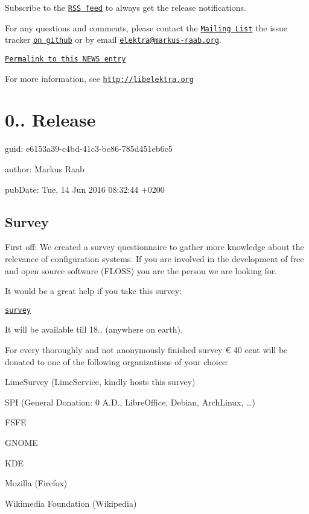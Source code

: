 Subscribe to the \href{http://doc.libelektra.org/news/feed.rss}{\tt R\+S\+S feed} to always get the release notifications.

For any questions and comments, please contact the \href{https://lists.sourceforge.net/lists/listinfo/registry-list}{\tt Mailing List} the issue tracker \href{http://git.libelektra.org/issues}{\tt on github} or by email \href{mailto:elektra@markus-raab.org}{\tt elektra@markus-\/raab.\+org}.

\href{http://doc.libelektra.org/news/190576e0-9fef-486e-b8da-c4e75be08329.html}{\tt Permalink to this N\+E\+W\+S entry}

For more information, see \href{http://libelektra.org}{\tt http\+://libelektra.\+org}

\section*{0.. Release}


\begin{DoxyItemize}
\item guid\+: e6153a39-\/c4bd-\/41c3-\/bc86-\/785d451eb6c5
\item author\+: Markus Raab
\item pub\+Date\+: Tue, 14 Jun 2016 08\+:32\+:44 +0200
\end{DoxyItemize}

\subsection*{Survey}

First off\+: We created a survey questionnaire to gather more knowledge about the relevance of configuration systems. If you are involved in the development of free and open source software (F\+L\+O\+S\+S) you are the person we are looking for.

It would be a great help if you take this survey\+:

\href{http://elektra.limequery.org/625192}{\tt survey}

It will be available till 18.. (anywhere on earth).

For every thoroughly and not anonymously finished survey € 40 cent will be donated to one of the following organizations of your choice\+:


\begin{DoxyItemize}
\item Lime\+Survey (Lime\+Service, kindly hosts this survey)
\item S\+P\+I (General Donation\+: 0 A.\+D., Libre\+Office, Debian, Arch\+Linux, …)
\item F\+S\+F\+E
\item G\+N\+O\+M\+E
\item K\+D\+E
\item Mozilla (Firefox)
\item Wikimedia Foundation (Wikipedia)
\end{DoxyItemize}

